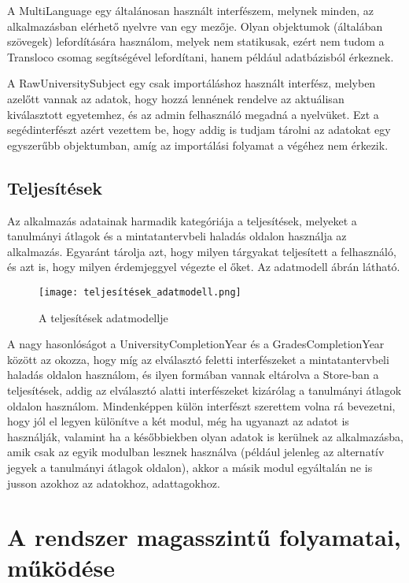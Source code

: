 \documentclass[a4paper,12pt]{report}
\begin{document}
A MultiLanguage egy általánosan használt interfészem, melynek minden, az alkalmazásban elérhető nyelvre van egy mezője. Olyan objektumok (általában szövegek) lefordítására használom, melyek nem statikusak, ezért nem tudom a Transloco csomag segítségével lefordítani, hanem például adatbázisból érkeznek.

A RawUniversitySubject egy csak importáláshoz használt interfész, melyben azelőtt vannak az adatok, hogy hozzá lennének rendelve az aktuálisan kiválasztott egyetemhez, és az admin felhasználó megadná a nyelvüket. Ezt a segédinterfészt azért vezettem be, hogy addig is tudjam tárolni az adatokat egy egyszerűbb objektumban, amíg az importálási folyamat a végéhez nem érkezik.

\subsection{Teljesítések}

Az alkalmazás adatainak harmadik kategóriája a teljesítések, melyeket a tanulmányi átlagok és a mintatantervbeli haladás oldalon használja az alkalmazás. Egyaránt tárolja azt, hogy milyen tárgyakat teljesített a felhasználó, és azt is, hogy milyen érdemjeggyel végezte el őket. Az adatmodell  ábrán látható.

\begin{figure}[h]
    \centering
    \texttt{[image: teljesítések\_adatmodell.png]}
    \caption{A teljesítések adatmodellje}
    \label{fig:data_model_completions}
\end{figure}

A nagy hasonlóságot a UniversityCompletionYear és a GradesCompletionYear között az okozza, hogy míg az elválasztó feletti interfészeket a mintatantervbeli haladás oldalon használom, és ilyen formában vannak eltárolva a Store-ban a teljesítések, addig az elválasztó alatti interfészeket kizárólag a tanulmányi átlagok oldalon használom. Mindenképpen külön interfészt szerettem volna rá bevezetni, hogy jól el legyen különítve a két modul, még ha ugyanazt az adatot is használják, valamint ha a későbbiekben olyan adatok is kerülnek az alkalmazásba, amik csak az egyik modulban lesznek használva (például jelenleg az alternatív jegyek a tanulmányi átlagok oldalon), akkor a másik modul egyáltalán ne is jusson azokhoz az adatokhoz, adattagokhoz.

\section{A rendszer magasszintű folyamatai, működése}
\end{document}
